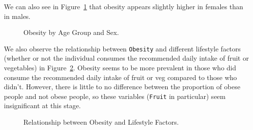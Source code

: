 \documentclass[
  letterpaper,
  DIV=11,
  numbers=noendperiod]{scrartcl}
\begin{document}
We can also see in Figure~\ref{fig-bar2} that obesity appears slightly
higher in females than in males.

\begin{figure}


\caption{\label{fig-bar2}Obesity by Age Group and Sex.}

\end{figure}%

We also observe the relationship between \texttt{Obesity} and different
lifestyle factors (whether or not the individual consumes the
recommended daily intake of fruit or vegetables) in
Figure~\ref{fig-bar3}. Obesity seems to be more prevalent in those who
did consume the recommended daily intake of fruit or veg compared to
those who didn't. However, there is little to no difference between the
proportion of obese people and not obese people, so these variables
(\texttt{Fruit} in particular) seem insignificant at this stage.

\begin{figure}


\caption{\label{fig-bar3}Relationship between Obesity and Lifestyle
Factors.}

\end{figure}%
\end{document}
